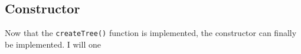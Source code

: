 \documentclass[../../../../main.tex]{subfiles}
\begin{document}
\subsection{Constructor}
Now that the \texttt{createTree()} function is implemented, the constructor can finally be implemented.  I will one 
\newpage
\end{document}
